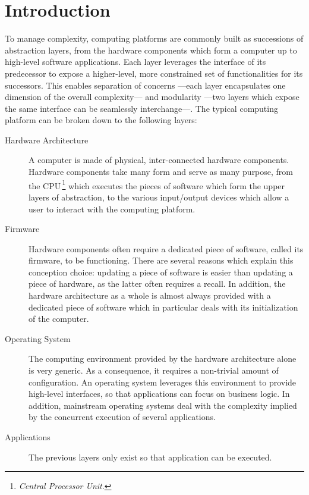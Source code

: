 \chapter{Introduction} \label{chapter:introduction}


\vspace{1cm}\noindent To manage complexity, computing platforms are commonly
built as successions of abstraction layers, from the hardware components which
form a computer up to high-level software applications.
%
Each layer leverages the interface of its predecessor to expose a higher-level,
more constrained set of functionalities for its successors.
%
This enables separation of concerns ---each layer encapsulates one dimension of
the overall complexity--- and modularity ---two layers which expose the same
interface can be seamlessly interchange---.
%
The typical computing platform can be broken down to the following layers:
%
\begin{description}
\item [Hardware Architecture]
  A computer is made of physical, inter-connected hardware components. Hardware
  components take many form and serve as many purpose, from the
  CPU\,\footnote{\emph{Central Processor Unit}.} which executes the pieces of
  software which form the upper layers of abstraction, to the various
  input/output devices which allow a user to interact with the computing
  platform.
\item [Firmware]
  Hardware components often require a dedicated piece of software, called its
  firmware, to be functioning. There are several reasons which explain this
  conception choice: updating a piece of software is easier than updating a
  piece of hardware, as the latter often requires a recall.
  In addition, the hardware architecture as a whole is almost always provided
  with a dedicated piece of software which in particular deals with its
  initialization of the computer.
\item [Operating System]
  The computing environment provided by the hardware architecture alone is very
  generic.
  As a consequence, it requires a non-trivial amount of configuration.
  An operating system leverages this environment to provide high-level
  interfaces, so that applications can focus on business logic.
  In addition, mainstream operating systems deal with the complexity implied by
  the concurrent execution of several applications.
\item [Applications]
  The previous layers only exist so that application can be executed.
\end{description}


